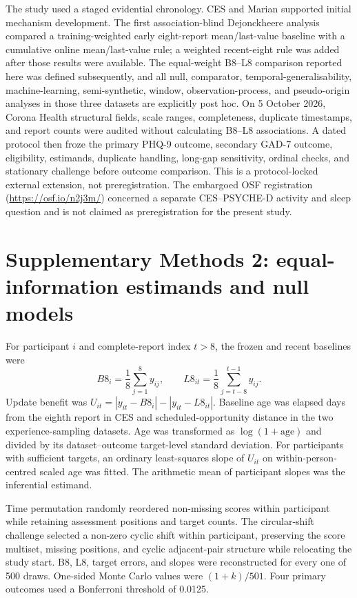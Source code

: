 \documentclass[pdflatex,sn-vancouver-num]{sn-jnl}
\begin{document}
The study used a staged evidential chronology. CES and Marian supported initial mechanism development. The first association-blind Dejonckheere analysis compared a training-weighted early eight-report mean/last-value baseline with a cumulative online mean/last-value rule; a weighted recent-eight rule was added after those results were available. The equal-weight B8--L8 comparison reported here was defined subsequently, and all null, comparator, temporal-generalisability, machine-learning, semi-synthetic, window, observation-process, and pseudo-origin analyses in those three datasets are explicitly post hoc. On 5 October 2026, Corona Health structural fields, scale ranges, completeness, duplicate timestamps, and report counts were audited without calculating B8--L8 associations. A dated protocol then froze the primary PHQ-9 outcome, secondary GAD-7 outcome, eligibility, estimands, duplicate handling, long-gap sensitivity, ordinal checks, and stationary challenge before outcome comparison. This is a protocol-locked external extension, not preregistration. The embargoed OSF registration (\url{https://osf.io/n2j3m/}) concerned a separate CES--PSYCHE-D activity and sleep question and is not claimed as preregistration for the present study.

\section{Supplementary Methods 2: equal-information estimands and null models}

For participant $i$ and complete-report index $t>8$, the frozen and recent baselines were
\[
B8_i=\frac{1}{8}\sum_{j=1}^{8}y_{ij},\qquad
L8_{it}=\frac{1}{8}\sum_{j=t-8}^{t-1}y_{ij}.
\]
Update benefit was $U_{it}=|y_{it}-B8_i|-|y_{it}-L8_{it}|$. Baseline age was elapsed days from the eighth report in CES and scheduled-opportunity distance in the two experience-sampling datasets. Age was transformed as $\log(1+\mathrm{age})$ and divided by its dataset--outcome target-level standard deviation. For participants with sufficient targets, an ordinary least-squares slope of $U_{it}$ on within-person-centred scaled age was fitted. The arithmetic mean of participant slopes was the inferential estimand.

Time permutation randomly reordered non-missing scores within participant while retaining assessment positions and target counts. The circular-shift challenge selected a non-zero cyclic shift within participant, preserving the score multiset, missing positions, and cyclic adjacent-pair structure while relocating the study start. B8, L8, target errors, and slopes were reconstructed for every one of 500 draws. One-sided Monte Carlo values were $(1+k)/501$. Four primary outcomes used a Bonferroni threshold of 0.0125.
\end{document}
